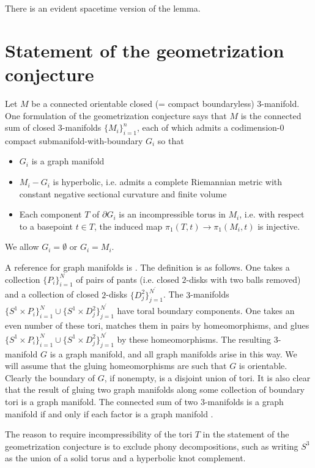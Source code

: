 \documentclass[12pt]{amsart}
\numberwithin{equation}{section}
\theoremstyle{plain}
\theoremstyle{definition}
\theoremstyle{remark}
\begin{document}
There is an evident spacetime version of the lemma.

\section{Statement of the geometrization conjecture} \label{geom}

Let $M$ be a connected orientable closed (= compact boundaryless) $3$-manifold.
One formulation of the geometrization conjecture says that
$M$ is the connected sum of closed $3$-manifolds $\{M_i\}_{i=1}^n$, each of
which admits a codimension-$0$ compact submanifold-with-boundary $G_i$
so that 
\begin{itemize}
\item $G_i$ is a graph manifold
\item $M_i - G_i$ is hyperbolic, i.e. admits a
complete Riemannian metric with constant negative sectional curvature
and finite volume
\item Each component $T$ of $\partial G_i$ is an incompressible torus in $M_i$,
i.e. with respect to a basepoint $t \in T$, the induced map
$\pi_1(T, t) \rightarrow \pi_1(M_i, t)$ is injective.
\end{itemize}
We allow $G_i = \emptyset$ or $G_i = M_i$. 

A reference for graph manifolds is
\cite[Chapter 2.4]{Matveev}. The definition is as follows.
One takes a collection $\{P_i\}_{i=1}^N$ of pairs of pants
(i.e. closed $2$-disks with two balls removed)
and a collection of closed $2$-disks $\{D^2_j\}_{j=1}^{N^\prime}$. The
$3$-manifolds $\{S^1 \times P_i\}_{i=1}^N
\cup \{S^1 \times D^2_j\}_{j=1}^{N^\prime}$ have toral boundary components.
One takes an even number of these tori, matches them in pairs by
homeomorphisms, and glues $\{S^1 \times P_i\}_{i=1}^N
\cup \{S^1 \times D^2_j\}_{j=1}^{N^\prime}$ by these homeomorphisms.
The
resulting $3$-manifold $G$ is a graph manifold, and all 
graph manifolds
arise in this way.  
We will assume that the gluing homeomorphisms are such that
$G$ is orientable.  
Clearly the boundary of $G$, if nonempty, is a
disjoint union of tori. It is also clear that the result of
gluing two graph manifolds along some collection of boundary tori is
a graph manifold. The connected sum of two $3$-manifolds is a 
graph manifold if and only if each factor is a graph manifold 
\cite[Proposition 2.4.3]{Matveev}.

The reason to require incompressibility of the tori $T$ in the
statement of the geometrization conjecture is to
exclude phony decompositions, such as writing $S^3$ as the
union of a solid torus and a hyperbolic knot complement.
\end{document}
